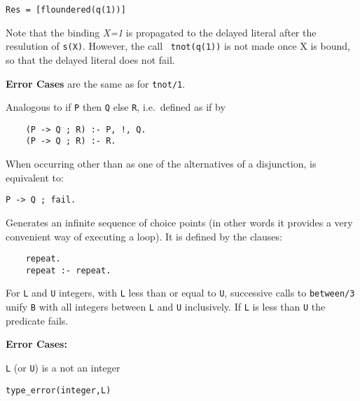 \begin{description}
\begin{verbatim}
Res = [floundered(q(1))]
\end{verbatim}
Note that the binding {\em X=1} is propagated to the delayed literal
after the resulution of {\tt s(X)}.  However, the call {\tt
  tnot(q(1))} is not made once X is bound, so that the delayed literal
does not fail.

{\bf Error Cases} are the same as for {\tt tnot/1}.


    Analogous to if {\tt P} then {\tt Q} else {\tt R}, i.e.\ defined as 
    if by
	\begin{center}
	\begin{minipage}{2.10in}
	\begin{verbatim}
	(P -> Q ; R) :- P, !, Q.
	(P -> Q ; R) :- R.
	\end{verbatim}
	\end{minipage}
	\end{center}

 
    When occurring other than as one of the alternatives of a disjunction,
    is equivalent to:
	\begin{center}
	{\tt P -> Q ; fail.}
	\end{center}

    Generates an infinite sequence of choice points (in other words it 
    provides a very convenient way of executing a loop). It is defined 
    by the clauses:
    \begin{center}
    \begin{minipage}{1.5in}
    \begin{verbatim}
	repeat.
	repeat :- repeat.
    \end{verbatim}
    \end{minipage}
    \end{center}

%
For {\tt L} and {\tt U} integers, with {\tt L} less than or equal to
{\tt U}, successive calls to {\tt between/3} unify {\tt B} with all
integers between {\tt L} and {\tt U} inclusively.  If {\tt L} is less
than {\tt U} the predicate fails.

{\bf Error Cases:}
\bi
\item 	{\tt L} (or {\tt U}) is a not an integer
\bi
\item 	{\tt type\_error(integer,L)}
\ei
\ei
\end{description}

